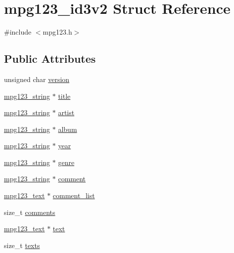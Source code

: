 \hypertarget{structmpg123__id3v2}{}\section{mpg123\+\_\+id3v2 Struct Reference}
\label{structmpg123__id3v2}


{\ttfamily \#include $<$mpg123.\+h$>$}

\subsection*{Public Attributes}
\begin{DoxyCompactItemize}
\item 
unsigned char \mbox{\hyperlink{structmpg123__id3v2_ab64e67e2d2bc5cc0b45e9598a8d386d6}{version}}
\item 
\mbox{\hyperlink{structmpg123__string}{mpg123\+\_\+string}} $\ast$ \mbox{\hyperlink{structmpg123__id3v2_a287e2a93e889c4a9b60b634a4dee4f13}{title}}
\item 
\mbox{\hyperlink{structmpg123__string}{mpg123\+\_\+string}} $\ast$ \mbox{\hyperlink{structmpg123__id3v2_a5d269222d5c917356f337e999a38c1f3}{artist}}
\item 
\mbox{\hyperlink{structmpg123__string}{mpg123\+\_\+string}} $\ast$ \mbox{\hyperlink{structmpg123__id3v2_adb45f4408f3e650dc70282060d631336}{album}}
\item 
\mbox{\hyperlink{structmpg123__string}{mpg123\+\_\+string}} $\ast$ \mbox{\hyperlink{structmpg123__id3v2_a6b2125b4b38019370646be4dc4a9ad23}{year}}
\item 
\mbox{\hyperlink{structmpg123__string}{mpg123\+\_\+string}} $\ast$ \mbox{\hyperlink{structmpg123__id3v2_a1655bf8bfc836ab94660bf981373f3cb}{genre}}
\item 
\mbox{\hyperlink{structmpg123__string}{mpg123\+\_\+string}} $\ast$ \mbox{\hyperlink{structmpg123__id3v2_a33f276ee0202d9bb8609b90a2dc84e41}{comment}}
\item 
\mbox{\hyperlink{structmpg123__text}{mpg123\+\_\+text}} $\ast$ \mbox{\hyperlink{structmpg123__id3v2_ab848dd213b0c7c352ccf4db299eb47fb}{comment\+\_\+list}}
\item 
size\+\_\+t \mbox{\hyperlink{structmpg123__id3v2_aa6b0ae610df4b4f5ed7f848ed88c86c9}{comments}}
\item 
\mbox{\hyperlink{structmpg123__text}{mpg123\+\_\+text}} $\ast$ \mbox{\hyperlink{structmpg123__id3v2_a2974751dc4b5bc34819d0acb1b90e944}{text}}
\item 
size\+\_\+t \mbox{\hyperlink{structmpg123__id3v2_a1ea43150e210d554f297bc317d5fb8ea}{texts}}

\end{DoxyCompactItemize}
